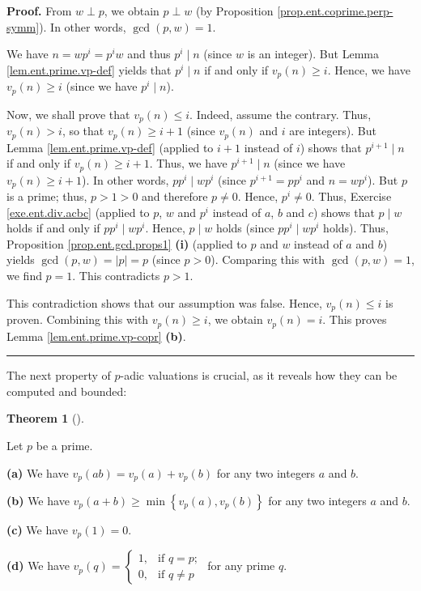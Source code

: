 \documentclass[numbers=enddot,12pt,final,onecolumn,notitlepage]{scrartcl}%
\numberwithin{exer}{subsection}
\theoremstyle{definition}
\newtheorem{theo}{Theorem}[subsection]
\newenvironment{theorem}[1][]
{\begin{theo}[#1]\begin{leftbar}}
{\end{leftbar}\end{theo}}
\newenvironment{proof}[1][Proof]{\noindent\textbf{#1.} }{\ \rule{0.5em}{0.5em}}
\begin{document}
\begin{proof}
From $w\perp p$, we obtain $p\perp w$ (by Proposition
\ref{prop.ent.coprime.perp-symm}). In other words, $\gcd\left(  p,w\right)
=1$.

We have $n=wp^{i}=p^{i}w$ and thus $p^{i}\mid n$ (since $w$ is an integer).
But Lemma \ref{lem.ent.prime.vp-def} yields that $p^{i}\mid n$ if and only if
$v_{p}\left(  n\right)  \geq i$. Hence, we have $v_{p}\left(  n\right)  \geq
i$ (since we have $p^{i}\mid n$).

Now, we shall prove that $v_{p}\left(  n\right)  \leq i$. Indeed, assume the
contrary. Thus, $v_{p}\left(  n\right)  >i$, so that $v_{p}\left(  n\right)
\geq i+1$ (since $v_{p}\left(  n\right)  $ and $i$ are integers). But Lemma
\ref{lem.ent.prime.vp-def} (applied to $i+1$ instead of $i$) shows that
$p^{i+1}\mid n$ if and only if $v_{p}\left(  n\right)  \geq i+1$. Thus, we
have $p^{i+1}\mid n$ (since we have $v_{p}\left(  n\right)  \geq i+1$). In
other words, $pp^{i}\mid wp^{i}$ (since $p^{i+1}=pp^{i}$ and $n=wp^{i}$). But
$p$ is a prime; thus, $p>1>0$ and therefore $p\neq0$. Hence, $p^{i}\neq0$.
Thus, Exercise \ref{exe.ent.div.acbc} (applied to $p$, $w$ and $p^{i}$ instead
of $a$, $b$ and $c$) shows that $p\mid w$ holds if and only if $pp^{i}\mid
wp^{i}$. Hence, $p\mid w$ holds (since $pp^{i}\mid wp^{i}$ holds). Thus,
Proposition \ref{prop.ent.gcd.props1} \textbf{(i)} (applied to $p$ and $w$
instead of $a$ and $b$) yields $\gcd\left(  p,w\right)  =\left\vert
p\right\vert =p$ (since $p>0$). Comparing this with $\gcd\left(  p,w\right)
=1$, we find $p=1$. This contradicts $p>1$.

This contradiction shows that our assumption was false. Hence, $v_{p}\left(
n\right)  \leq i$ is proven. Combining this with $v_{p}\left(  n\right)  \geq
i$, we obtain $v_{p}\left(  n\right)  =i$. This proves Lemma
\ref{lem.ent.prime.vp-copr} \textbf{(b)}.
\end{proof}

The next property of $p$-adic valuations is crucial, as it reveals how they
can be computed and bounded:

\begin{theorem}
\label{thm.ent.prime.vp-ring}Let $p$ be a prime.

\textbf{(a)} We have $v_{p}\left(  ab\right)  =v_{p}\left(  a\right)
+v_{p}\left(  b\right)  $ for any two integers $a$ and $b$.

\textbf{(b)} We have $v_{p}\left(  a+b\right)  \geq\min\left\{  v_{p}\left(
a\right)  ,v_{p}\left(  b\right)  \right\}  $ for any two integers $a$ and $b$.

\textbf{(c)} We have $v_{p}\left(  1\right)  =0$.

\textbf{(d)} We have $v_{p}\left(  q\right)  =%
\begin{cases}
1, & \text{if }q=p;\\
0, & \text{if }q\neq p
\end{cases}
$ for any prime $q$.
\end{theorem}
\end{document}
